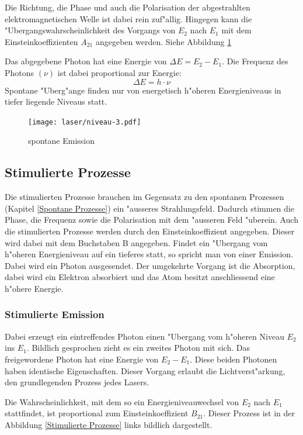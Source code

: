 \begin{refsection}
Die Richtung, die Phase und auch die Polarisation der abgestrahlten
elektromagnetischen Welle ist dabei rein zuf"allig.
Hingegen kann die "Ubergangswahrscheinlichkeit des Vorgangs von $E_2$ nach
$E_1$ mit dem Einsteinkoeffizienten $A_{21}$ angegeben werden.
Siehe Abbildung \ref{spontane Emission}

Das abgegebene Photon hat eine Energie von $\Delta E = E_2 - E_1$.
Die Frequenz des Photons $(\nu)$ ist dabei proportional zur Energie:
\[ \Delta E = h\cdot \nu\]
Spontane "Uberg"ange finden nur von energetisch h"oheren Energieniveaus in
tiefer liegende Niveaus statt.\cite{Laserprinzip}

\begin{figure}
\centering
\texttt{[image: laser/niveau-3.pdf]}
\caption{spontane Emission}
\label{spontane Emission}
\end{figure}


\subsection{Stimulierte Prozesse}
Die stimulierten Prozesse brauchen im Gegensatz zu den spontanen
Prozessen (Kapitel \ref{Spontane Prozesse}) ein "ausseres Strahlungsfeld.
Dadurch stimmen die Phase, die Frequenz sowie die Polarisation mit dem
"ausseren Feld "uberein.
Auch die stimulierten Prozesse werden durch den Einsteinkoeffizient angegeben.
Dieser wird dabei mit dem Buchstaben B angegeben.
Findet ein "Ubergang vom h"oheren Energieniveau auf ein tieferes statt,
so spricht man von einer Emission. Dabei wird ein Photon ausgesendet.
Der umgekehrte Vorgang ist die Absorption, dabei wird ein Elektron absorbiert
und das Atom besitzt anschliessend eine h"ohere Energie.


\subsubsection{Stimulierte Emission}

Dabei erzeugt ein eintreffendes Photon einen "Ubergang vom h"oheren Niveau
$E_2$ ins $E_1$. 
Bildlich gesprochen zieht es ein zweites Photon mit sich.
Das freigewordene Photon hat eine Energie von $E_2 - E_1$.
Diese beiden Photonen haben identische Eigenschaften.
Dieser Vorgang erlaubt die Lichtverst"arkung, den grundlegenden Prozess jedes
Lasers. \cite{Laserphysik}

Die Wahrscheinlichkeit, mit dem so ein Energieniveauwechsel von $E_2$ nach
$E_1$ stattfindet, ist proportional zum Einsteinkoeffizient $B_{21}$.
Dieser Prozess ist in der Abbildung \ref{Stimulierte Prozesse} links bildlich
dargestellt.


\end{refsection}
